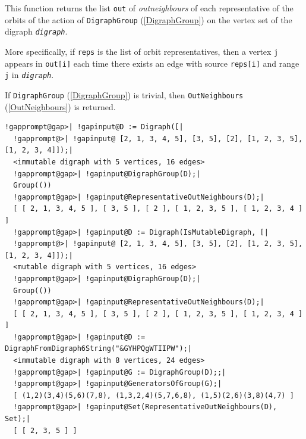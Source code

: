 \documentclass[a4paper,11pt]{report}
\begin{document}
{{{ This function returns the list \texttt{out} of \emph{out\texttt{}neighbours} of each representative of the orbits of the action of \texttt{DigraphGroup} (\ref{DigraphGroup}) on the vertex set of the digraph \mbox{\texttt{\mdseries\slshape digraph}}. 

 More specifically, if \texttt{reps} is the list of orbit representatives, then a vertex \texttt{j} appears in \texttt{out[i]} each time there exists an edge with source \texttt{reps[i]} and range \texttt{j} in \mbox{\texttt{\mdseries\slshape digraph}}. 

 If \texttt{DigraphGroup} (\ref{DigraphGroup}) is trivial, then \texttt{OutNeighbours} (\ref{OutNeighbours}) is returned. 
\begin{Verbatim}[commandchars=!@|,fontsize=\small,frame=single,label=Example]
  !gapprompt@gap>| !gapinput@D := Digraph([|
  !gapprompt@>| !gapinput@ [2, 1, 3, 4, 5], [3, 5], [2], [1, 2, 3, 5], [1, 2, 3, 4]]);|
  <immutable digraph with 5 vertices, 16 edges>
  !gapprompt@gap>| !gapinput@DigraphGroup(D);|
  Group(())
  !gapprompt@gap>| !gapinput@RepresentativeOutNeighbours(D);|
  [ [ 2, 1, 3, 4, 5 ], [ 3, 5 ], [ 2 ], [ 1, 2, 3, 5 ], [ 1, 2, 3, 4 ] ]
  !gapprompt@gap>| !gapinput@D := Digraph(IsMutableDigraph, [|
  !gapprompt@>| !gapinput@ [2, 1, 3, 4, 5], [3, 5], [2], [1, 2, 3, 5], [1, 2, 3, 4]]);|
  <mutable digraph with 5 vertices, 16 edges>
  !gapprompt@gap>| !gapinput@DigraphGroup(D);|
  Group(())
  !gapprompt@gap>| !gapinput@RepresentativeOutNeighbours(D);|
  [ [ 2, 1, 3, 4, 5 ], [ 3, 5 ], [ 2 ], [ 1, 2, 3, 5 ], [ 1, 2, 3, 4 ] ]
  !gapprompt@gap>| !gapinput@D := DigraphFromDigraph6String("&GYHPQgWTIIPW");|
  <immutable digraph with 8 vertices, 24 edges>
  !gapprompt@gap>| !gapinput@G := DigraphGroup(D);;|
  !gapprompt@gap>| !gapinput@GeneratorsOfGroup(G);|
  [ (1,2)(3,4)(5,6)(7,8), (1,3,2,4)(5,7,6,8), (1,5)(2,6)(3,8)(4,7) ]
  !gapprompt@gap>| !gapinput@Set(RepresentativeOutNeighbours(D), Set);|
  [ [ 2, 3, 5 ] ]
\end{Verbatim}
 }

 

}}
\end{document}
